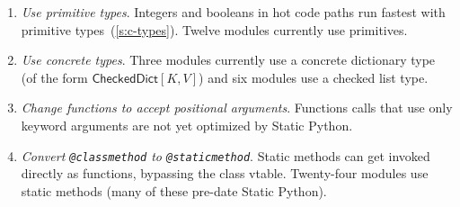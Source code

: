 \documentclass[english,cleveref,submission]{programming}
\newcommand{\SP}{Static Python}
\newcommand{\code}[1]{\texttt{#1}}
\newcommand{\ipara}[1]{\emph{#1}\/.}
\newcommand{\typefont}[1]{\mathsf{#1}}
\newcommand{\paramtype}[2]{#1[#2]}
\newcommand{\sptrawchkdict}{\typefont{CheckedDict}} %
\newcommand{\sptchkdict}[2]{\paramtype{\sptrawchkdict}{#1, #2}}
\begin{document}
\begin{enumerate}
  \item
    \ipara{Use primitive types}
    Integers and booleans in hot code paths run fastest with
    primitive types~(\cref{s:c-types}).
    Twelve modules currently use primitives.

  \item
    \ipara{Use concrete types}
    Three modules currently use a concrete dictionary type
    (of the form $\sptchkdict{K}{V}$)
    and six modules use a checked list type.

  \item
    \ipara{Change functions to accept positional arguments}
    Functions calls that use only keyword arguments are not yet optimized by \SP{}.


  \item
    \ipara{Convert \code{@classmethod} to \code{@staticmethod}}
    Static methods can get invoked directly as functions, bypassing the class vtable.
    Twenty-four modules use static methods (many of these pre-date \SP{}).


\end{enumerate}


\end{document}
